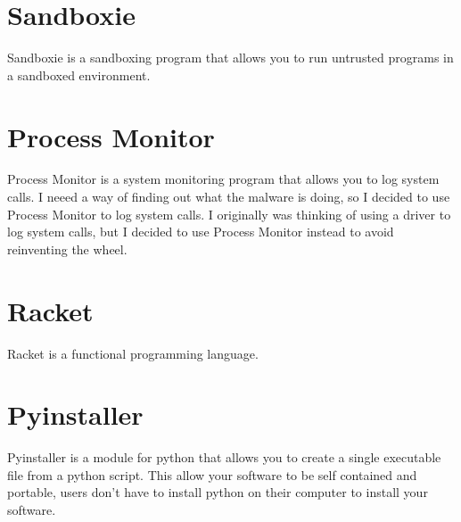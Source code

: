 \section{Sandboxie}
Sandboxie is a sandboxing program that allows you to run untrusted programs in a sandboxed environment.

\section{Process Monitor}
Process Monitor is a system monitoring program that allows you to log system calls.
I neeed a way of finding out what the malware is doing, so I decided to use Process Monitor to log system calls.
I originally was thinking of using a driver to log system calls, but I decided to use Process Monitor instead to avoid reinventing the wheel.

\section{Racket}
Racket is a functional programming language.

\section{Pyinstaller}
Pyinstaller is a module for python that allows you to create a single executable file from a python script.
This allow your software to be self contained and portable, users don't have to install python on their computer to install your software.

